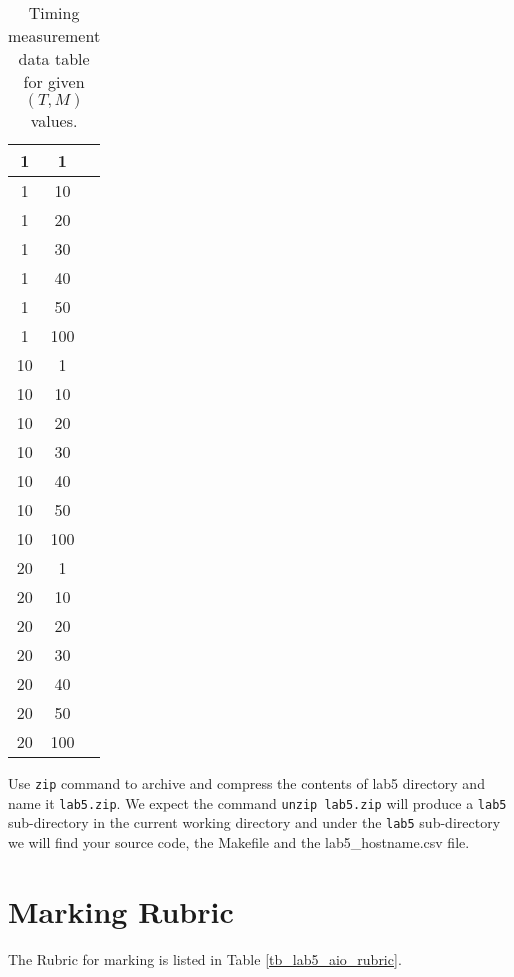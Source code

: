\begin{enumerate}
\begin{table}[h]
\begin{center}
\begin{tabular}{|c|c|c|}
1 &    1 &    \\ \hline
1 &    10 &    \\ \hline
1 &    20 &    \\ \hline
1 &    30 &    \\ \hline
1 &    40 &    \\ \hline
1 &    50 &    \\ \hline
1 &    100 &    \\ \hline
10 &    1 &    \\ \hline
10 &    10 &    \\ \hline
10 &    20 &    \\ \hline
10 &    30 &    \\ \hline
10 &    40 &    \\ \hline
10 &    50 &    \\ \hline
10 &    100 &    \\ \hline
20 &    1 &    \\ \hline
20 &    10 &    \\ \hline
20 &    20 &    \\ \hline
20 &    30 &    \\ \hline
20 &    40 &    \\ \hline
20 &    50 &    \\ \hline
20 &    100 &    \\ \hline

\end{tabular}
\caption{Timing measurement data table for given $(T, M)$ values.}
\label{tb_timing_lab5}
\end{center}
\end{table}
\end{enumerate}
Use \verb+zip+ command to archive and compress the contents of lab5 directory and name it \verb+lab5.zip+. We expect the command \verb+unzip lab5.zip+ will produce a \verb+lab5+ sub-directory in the current working directory and under the \verb+lab5+ sub-directory we will find your source code, the Makefile and the lab5\_hostname.csv file.

\section{Marking Rubric}
The Rubric for marking is listed in Table \ref{tb_lab5_aio_rubric}.

